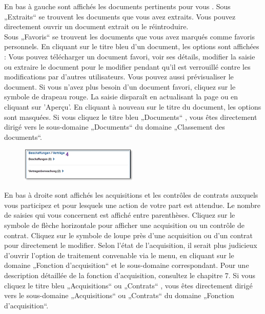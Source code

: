 \vspace{\baselineskip}

En bas à gauche sont affichés les documents pertinents pour vous . Sous „Extraits“ se trouvent les documents que vous avez extraits. Vous pouvez directement ouvrir un document extrait ou le réintroduire. \\

Sous „Favoris“ se trouvent les documents que vous avez marqués comme favoris personnels. En cliquant sur le titre bleu d'un document, les options sont affichées : Vous pouvez télécharger un document favori, voir ses détails, modifier la saisie ou extraire le document pour le modifier pendant qu'il est verrouillé contre les modifications par d'autres utilisateurs. Vous pouvez aussi prévisualiser le document. Si vous n'avez plus besoin d'un document favori, cliquez sur le symbole de drapeau rouge. La saisie disparaît en actualisant la page ou en cliquant sur 'Aperçu'. En cliquant à nouveau sur le titre du document, les options sont  masquées. Si vous cliquez le titre bleu „Documents“ , vous êtes directement dirigé vers le sous-domaine „Documents“ du domaine „Classement des documents“.

\vspace{\baselineskip}


\begin{figure}
  \vspace{-20pt}
  \begin{center}
    \includegraphics[width=0.5\textwidth]{../chapters/01_Einfuehrung/pictures/1-3-2_persUebersichtBeschaffung.jpg}
  \end{center}
  \vspace{-20pt}
  \vspace{-10pt}
\end{figure}
En bas à droite sont affichés les acquisitions et les contrôles de contrats  auxquels vous participez et pour lesquels une action de votre part est attendue. Le nombre de saisies qui vous concernent est affiché entre parenthèses. Cliquez sur le symbole de flèche horizontale pour afficher une acquisition ou un contrôle de contrat. Cliquez sur le symbole de loupe près d'une acquisition ou d'un contrat pour directement le modifier. Selon l'état de l'acquisition, il serait plus judicieux d'ouvrir l'option de traitement convenable via le menu, en cliquant sur le domaine „Fonction d'acquisition“ et le sous-domaine correspondant. Pour une description détaillée de la fonction d’acquisition, consultez le chapitre 7. Si vous cliquez le titre bleu „Acquisitions“ ou „Contrats“ , vous êtes directement dirigé vers le sous-domaine „Acquisitions“ ou „Contrats“ du domaine „Fonction d'acquisition“.

